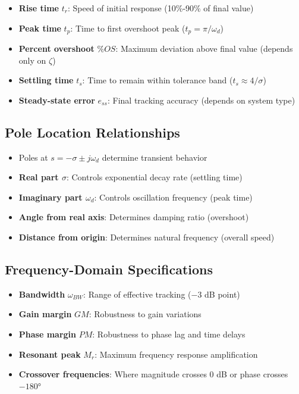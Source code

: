 \begin{itemize}
    \item \textbf{Rise time} $t_r$: Speed of initial response (10\%-90\% of final value)
    \item \textbf{Peak time} $t_p$: Time to first overshoot peak ($t_p = \pi/\omega_d$)
    \item \textbf{Percent overshoot} $\%OS$: Maximum deviation above final value (depends only on $\zeta$)
    \item \textbf{Settling time} $t_s$: Time to remain within tolerance band ($t_s \approx 4/\sigma$)
    \item \textbf{Steady-state error} $e_{ss}$: Final tracking accuracy (depends on system type)
\end{itemize}

\subsection{Pole Location Relationships}

\begin{itemize}
    \item Poles at $s = -\sigma \pm j\omega_d$ determine transient behavior
    \item \textbf{Real part $\sigma$}: Controls exponential decay rate (settling time)
    \item \textbf{Imaginary part $\omega_d$}: Controls oscillation frequency (peak time)
    \item \textbf{Angle from real axis}: Determines damping ratio (overshoot)
    \item \textbf{Distance from origin}: Determines natural frequency (overall speed)
\end{itemize}

\subsection{Frequency-Domain Specifications}

\begin{itemize}
    \item \textbf{Bandwidth} $\omega_{BW}$: Range of effective tracking ($-3$ dB point)
    \item \textbf{Gain margin} $GM$: Robustness to gain variations
    \item \textbf{Phase margin} $PM$: Robustness to phase lag and time delays
    \item \textbf{Resonant peak} $M_r$: Maximum frequency response amplification
    \item \textbf{Crossover frequencies}: Where magnitude crosses 0 dB or phase crosses $-180°$
\end{itemize}

